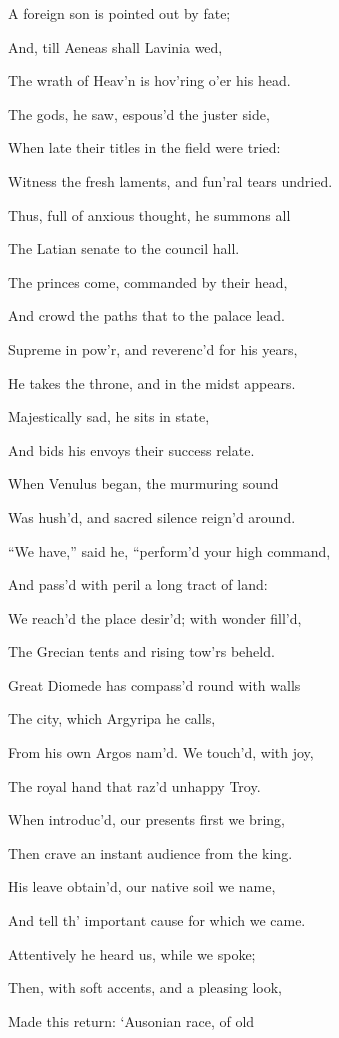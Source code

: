 A foreign son is pointed out by fate;

And, till Aeneas shall Lavinia wed,

The wrath of Heav’n is hov’ring o’er his head.

The gods, he saw, espous’d the juster side,

When late their titles in the field were tried:

Witness the fresh laments, and fun’ral tears undried.

Thus, full of anxious thought, he summons all

The Latian senate to the council hall.

The princes come, commanded by their head,

And crowd the paths that to the palace lead.

Supreme in pow’r, and reverenc’d for his years,

He takes the throne, and in the midst appears.

Majestically sad, he sits in state,

And bids his envoys their success relate.

When Venulus began, the murmuring sound

Was hush’d, and sacred silence reign’d around.

“We have,” said he, “perform’d your high command,

And pass’d with peril a long tract of land:

We reach’d the place desir’d; with wonder fill’d,

The Grecian tents and rising tow’rs beheld.

Great Diomede has compass’d round with walls

The city, which Argyripa he calls,

From his own Argos nam’d. We touch’d, with joy,

The royal hand that raz’d unhappy Troy.

When introduc’d, our presents first we bring,

Then crave an instant audience from the king.

His leave obtain’d, our native soil we name,

And tell th’ important cause for which we came.

Attentively he heard us, while we spoke;

Then, with soft accents, and a pleasing look,

Made this return: ‘Ausonian race, of old


